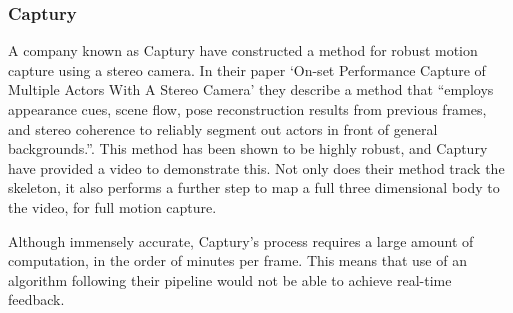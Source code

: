 \subsubsection{Captury}

A company known as Captury\cite{captury} have constructed a method for robust motion capture using a stereo camera. In their paper `On-set Performance Capture of Multiple Actors With A Stereo Camera'\cite{capturystereopaper} they describe a method that ``employs appearance cues, scene flow, pose reconstruction results from previous frames, and stereo coherence to reliably segment out actors in front of general backgrounds.''. This method has been shown to be highly robust, and Captury have provided a video\cite{capturyvideo} to demonstrate this. Not only does their method track the skeleton, it also performs a further step to map a full three dimensional body to the video, for full motion capture.

Although immensely accurate, Captury's process requires a large amount of computation, in the order of minutes per frame. This means that use of an algorithm following their pipeline would not be able to achieve real-time feedback.